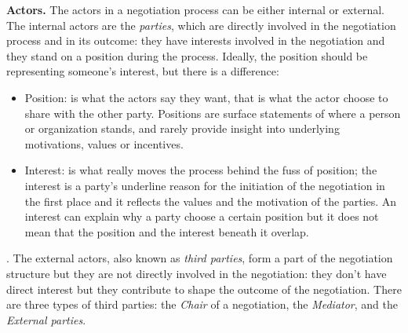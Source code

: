 \documentclass[../main.tex]{subfiles}
\begin{document}
\textbf{Actors.} The actors in a negotiation process can be either internal or external. The internal actors are the \textit{parties}, which are directly involved in the negotiation process and in its outcome: they have interests involved in the negotiation and they stand on a position during the process. Ideally, the position should be representing someone's interest, but there is a difference:
\begin{itemize}
\item Position: is what the actors say they want, that is what the actor choose to share with the other party. Positions are surface statements of where a person or organization stands, and rarely provide insight into underlying motivations, values or incentives\autocite[]{watershed}.
\item Interest: is what really moves the process behind the fuss of position; the interest is a party's underline reason for the initiation of the negotiation in the first place and it reflects the values and the motivation of the parties. An interest can explain why a party choose a certain position but it does not mean that the position and the interest beneath it overlap.
\end{itemize}. The external actors, also known as \textit{third parties}, form a part of the negotiation structure but they are not directly involved in the negotiation: they don't have direct interest but they contribute to shape the outcome of the negotiation. There are three types of third parties: the \textit{Chair} of a negotiation, the \textit{Mediator}, and the \textit{External parties}.
\end{document}
